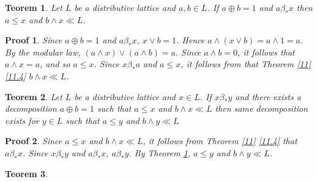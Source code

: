 \documentclass[a4paper,12pt]{article}
\numberwithin{equation}{section}
\theoremstyle{italik}
\newtheorem{teorem}{Teorem}[section]
\newtheorem*{ispat}{Proof}
\begin{document}
\begin{teorem}\label{12}
  Let $ L $ be a distributive lattice and $ a,b \in L $. If $ a \oplus b = 1 $ and $ a \beta_* x $ 
  then $ a \leq x $ and $ b \wedge x \ll L $.
\end{teorem}
\begin{ispat}
    Since $ a \oplus b = 1 $ and $ a \beta_* x $, $ x \vee b = 1 $. Hence $ a \wedge ( x \vee b ) = a \wedge 1 = a $. 
    By the modular law, $ ( a \wedge x ) \vee ( a \wedge b ) = a $. Since $ a \wedge b = 0 $, 
    it follows that $ a \wedge x = a $, and so $ a \leq x $. Since $ x \beta_* a $ and $ a \leq x $, 
    it follows from that Theorem \ref{11} \ref{11.4} $ b \wedge x \ll L $.
\end{ispat}


\begin{teorem}\label{13}
    Let $ L $ be a distributive lattice and $ x \in L $. If $ x \beta_* y $ and there exists a 
    decomposition $ a \oplus b = 1 $ such that $ a \leq x $ and $ b \wedge x \ll L $ then same 
    decomposition exists for $ y \in L $ such that $ a \leq y $ and $ b \wedge y \ll L $
\end{teorem}
\begin{ispat}
    Since $ a \leq x $ and $ b \wedge x \ll L $, it follows from Theorem \ref{11} \ref{11.4} 
    that $ a \beta_* x $. Since $ x \beta_* y $ and $ a \beta_* x $, $ a \beta_* y $. 
    By Theorem \ref{12}, $ a \leq y $ and $ b \wedge y \ll L $.
\end{ispat}


\begin{teorem}

\end{teorem}





  
\end{document}
